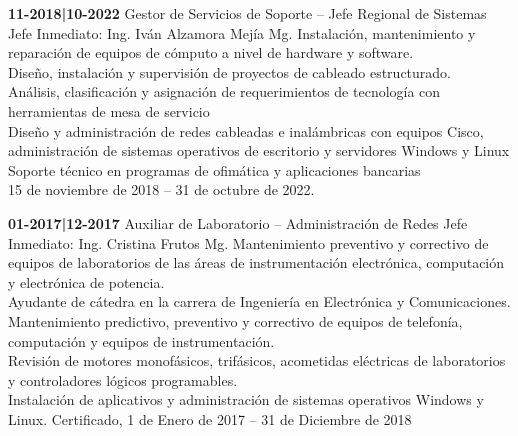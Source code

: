 \begin{levent}
    \cvevent
	{\textbf{11-2018|10-2022}}
	{Gestor de Servicios de Soporte -- Jefe Regional de Sistemas}
	{Jefe Inmediato: Ing. Iván Alzamora Mejía Mg.}
	{Instalación, mantenimiento y reparación de equipos de cómputo a nivel de hardware y software.\\
	Diseño, instalación y supervisión de proyectos de cableado estructurado.\\
	Análisis, clasificación y asignación de requerimientos de tecnología con herramientas de mesa de servicio\\
	Diseño y administración de redes cableadas e inalámbricas con equipos Cisco, administración de sistemas operativos de escritorio y servidores Windows y Linux \\
	Soporte técnico en programas de ofimática y aplicaciones bancarias\\
    }
	{15 de noviembre de 2018 – 31 de octubre de 2022.}
\end{levent}

\begin{devent}
    \cvevent
	{\textbf{01-2017|12-2017}}
	{Auxiliar de Laboratorio – Administración de Redes}
	{Jefe Inmediato: Ing. Cristina Frutos Mg.}
	{Mantenimiento preventivo y correctivo de equipos de laboratorios de las áreas de instrumentación electrónica, computación y electrónica de potencia.\\
	Ayudante de cátedra en la carrera de Ingeniería en Electrónica y Comunicaciones.\\
	Mantenimiento predictivo, preventivo y correctivo de equipos de telefonía, computación y equipos de instrumentación.\\ Revisión de motores monofásicos, trifásicos, acometidas eléctricas de laboratorios y controladores lógicos programables.\\
	Instalación de aplicativos y administración de  sistemas operativos Windows y Linux.
	}
	{Certificado,  1 de Enero de 2017 – 31 de Diciembre de 2018}
\end{devent}

\newpage
\setlength{\headheight}{15pt}
\pagestyle{fancy}
\fancyhf{}
\rhead[Ponencias]{\rightmark}
\lfoot[\thepage]{}
\rfoot[]{\thepage}  




